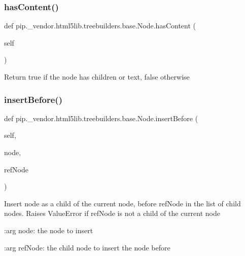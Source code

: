 \subsubsection{\texorpdfstring{has\+Content()}{hasContent()}}
{\footnotesize\ttfamily def pip.\+\_\+vendor.\+html5lib.\+treebuilders.\+base.\+Node.\+has\+Content (\begin{DoxyParamCaption}\item[{}]{self }\end{DoxyParamCaption})}

\begin{DoxyVerb}Return true if the node has children or text, false otherwise
\end{DoxyVerb}
 \mbox{\label{classpip_1_1__vendor_1_1html5lib_1_1treebuilders_1_1base_1_1Node_a29203f0cdff82b16ae8b6ffe3db00aea}} 
\subsubsection{\texorpdfstring{insert\+Before()}{insertBefore()}}
{\footnotesize\ttfamily def pip.\+\_\+vendor.\+html5lib.\+treebuilders.\+base.\+Node.\+insert\+Before (\begin{DoxyParamCaption}\item[{}]{self,  }\item[{}]{node,  }\item[{}]{ref\+Node }\end{DoxyParamCaption})}

\begin{DoxyVerb}Insert node as a child of the current node, before refNode in the
list of child nodes. Raises ValueError if refNode is not a child of
the current node

:arg node: the node to insert

:arg refNode: the child node to insert the node before\end{DoxyVerb}
 \mbox{\label{classpip_1_1__vendor_1_1html5lib_1_1treebuilders_1_1base_1_1Node_a97a4896f9c91d1d5fdf5634c7696e612}} 
